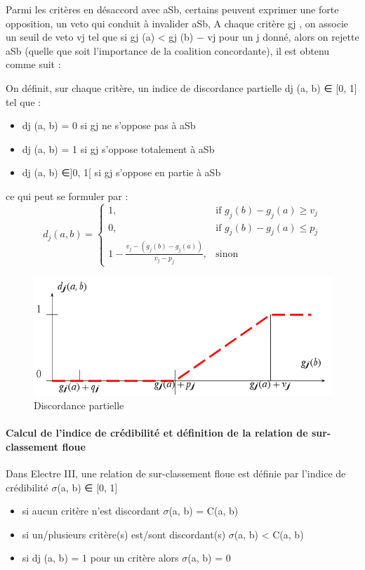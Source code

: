 Parmi les critères en désaccord avec aSb, certains peuvent exprimer une forte opposition, un veto qui conduit à invalider aSb, A chaque critère gj , on associe un seuil de veto vj  tel que si gj (a) < gj (b) − vj  pour un j  donné, alors on rejette aSb (quelle que soit l’importance de la coalition concordante),  il est obtenu comme suit :

On définit, sur chaque critère, un indice de discordance partielle dj (a, b) ∈ [0, 1] tel que :
\begin{itemize}
\item dj (a, b) = 0 si gj  ne s’oppose pas à aSb
\item dj (a, b) = 1 si gj  s’oppose totalement à aSb
\item dj (a, b) ∈]0, 1[ si gj  s’oppose en partie à aSb
\end{itemize}

ce qui peut se formuler par :
\[
    d_{j}(a, b)= 
\begin{cases}
    1 ,& \text{if } g_{j}(b) - g_{j}(a) \geq  v_{j}\\
    0 ,& \text{if } g_{j}(b) - g_{j}(a) \leq  p_{j}\\
    1 - \frac{v_{j} - (g_{j}(b)-g_{j}(a))}{v_{j} - p_{j}}  ,              & \text{sinon}
\end{cases}
\]

\begin{figure}[!h]
\begin{center}
\includegraphics{aide_multicrit_decision/disc_partielle.png}
\end{center}
\caption{Discordance partielle}
\end{figure}

\paragraph{Calcul de l’indice de crédibilité et définition de la relation de sur-classement floue}
Dans Electre III, une relation de sur-classement floue est définie par l’indice de crédibilité $\sigma$(a, b) ∈ [0, 1]
\begin{itemize}
\item si aucun critère n’est discordant $\sigma$(a, b) = C(a, b)
\item si un/plusieurs critère(s) est/sont discordant(s) $\sigma$(a, b) < C(a, b)
\item si dj (a, b) = 1 pour un critère alors $\sigma$(a, b) = 0
\end{itemize}
  
